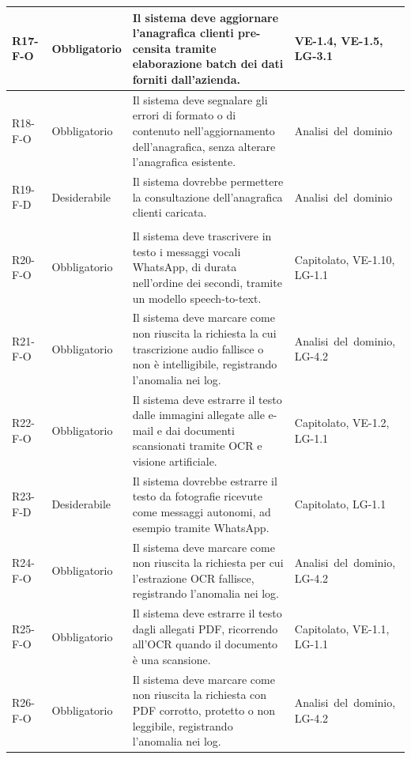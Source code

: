 {\begin{longtable}{|>{\raggedright\arraybackslash}p{1.8cm}|>{\raggedright\arraybackslash}p{2.3cm}|>{\raggedright\arraybackslash}p{6.6cm}|>{\raggedright\arraybackslash}p{3.1cm}|}
    \mbox{R17-F-O} & Obbligatorio & Il sistema deve aggiornare l'anagrafica clienti pre-censita tramite elaborazione batch dei dati forniti dall'azienda. & \mbox{VE-1.4}, \mbox{VE-1.5}, \mbox{LG-3.1} \\ \hline
    \mbox{R18-F-O} & Obbligatorio & Il sistema deve segnalare gli errori di formato o di contenuto nell'aggiornamento dell'anagrafica, senza alterare l'anagrafica esistente. & \mbox{Analisi del dominio} \\ \hline
    \mbox{R19-F-D} & Desiderabile & Il sistema dovrebbe permettere la consultazione dell'anagrafica clienti caricata. & \mbox{Analisi del dominio} \\ \hline
    \multicolumn{4}{|l|}{\cellcolor[gray]{0.94}\textbf{Macroarea 3 --- Estrazione dei dati multimodale}} \\ \hline
    \mbox{R20-F-O} & Obbligatorio & Il sistema deve trascrivere in testo i messaggi vocali WhatsApp, di durata nell'ordine dei secondi, tramite un modello speech-to-text. & \mbox{Capitolato}, \mbox{VE-1.10}, \mbox{LG-1.1} \\ \hline
    \mbox{R21-F-O} & Obbligatorio & Il sistema deve marcare come non riuscita la richiesta la cui trascrizione audio fallisce o non è intelligibile, registrando l'anomalia nei log. & \mbox{Analisi del dominio}, \mbox{LG-4.2} \\ \hline
    \mbox{R22-F-O} & Obbligatorio & Il sistema deve estrarre il testo dalle immagini allegate alle e-mail e dai documenti scansionati tramite OCR e visione artificiale. & \mbox{Capitolato}, \mbox{VE-1.2}, \mbox{LG-1.1} \\ \hline
    \mbox{R23-F-D} & Desiderabile & Il sistema dovrebbe estrarre il testo da fotografie ricevute come messaggi autonomi, ad esempio tramite WhatsApp. & \mbox{Capitolato}, \mbox{LG-1.1} \\ \hline
    \mbox{R24-F-O} & Obbligatorio & Il sistema deve marcare come non riuscita la richiesta per cui l'estrazione OCR fallisce, registrando l'anomalia nei log. & \mbox{Analisi del dominio}, \mbox{LG-4.2} \\ \hline
    \mbox{R25-F-O} & Obbligatorio & Il sistema deve estrarre il testo dagli allegati PDF, ricorrendo all'OCR quando il documento è una scansione. & \mbox{Capitolato}, \mbox{VE-1.1}, \mbox{LG-1.1} \\ \hline
    \mbox{R26-F-O} & Obbligatorio & Il sistema deve marcare come non riuscita la richiesta con PDF corrotto, protetto o non leggibile, registrando l'anomalia nei log. & \mbox{Analisi del dominio}, \mbox{LG-4.2} \\ \hline

\end{longtable}}

